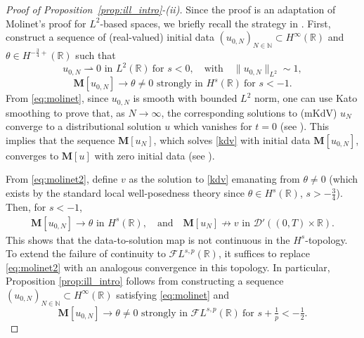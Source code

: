 \documentclass[a4paper,
11pt,  reqno]{amsart}
\newcommand{\5}{\textup{V}}
\newcommand{\FL}{\mathcal{F} L}
\theoremstyle{remark}
\newcommand{\R}{\mathbb{R}}
\newcommand{\MMb}{\mathbf{M}}
\newcommand{\N}{\mathbb{N}}
\numberwithin{equation}{section}
\numberwithin{theorem}{section}
\begin{document}
\begin{proof}[Proof of Proposition~\ref{prop:ill_intro}-(ii)]


Since the proof is an adaptation of Molinet's proof for $L^2$-based spaces, we briefly recall the strategy in \cite{Molinet_ill_line}.
 First, construct a sequence of (real-valued) initial data $(u_{0,N})_{N\in\N}\subset H^\infty(\R)$ and $\theta\in H^{-\frac34+}(\R)$ such that
\begin{equation}\label{eq:molinet}
	u_{0,N}\rightharpoonup 0 \mbox{ in }L^2(\R)\ \text{for } s<0,\quad \text{with}
    \quad \|u_{0,N}\|_{L^2}\sim 1,
\end{equation}
\begin{equation}\label{eq:molinet2}
 \MMb[u_{0,N}] \to \theta\neq 0  \mbox{ strongly in }H^{s}(\R)
 \ \text{for }
 s<-1.
\end{equation}
From \eqref{eq:molinet}, since $u_{0,N}$ is smooth with bounded $L^2$ norm, one can use Kato smoothing to prove that, as $N\to \infty$, the corresponding solutions to (mKdV) $u_N$ converge to a distributional solution $u$ which vanishes for $t=0$ (see \cite[Proposition 2.1]{Molinet_ill_line}). This implies that the sequence $\MMb[u_N]$, which solves \eqref{kdv} with initial data $\MMb[u_{0,N}]$, converges to $\MMb[u]$ with zero initial data (see \cite[Proposition 2.2]{Molinet_ill_line}).

From \eqref{eq:molinet2}, define $v$ as the solution to \eqref{kdv} emanating from $\theta\neq 0$ (which exists by the standard local well-posedness theory since $\theta\in H^s(\R)$, $s>-\frac34$).
Then, for $s<-1$,
\begin{align}
\MMb[u_{0, N}] \to \theta \mbox{ in }H^s(\R),
\quad
\text{and}
\quad
\MMb[u_N] \not\to v \mbox{ in  }\mathcal{D}'((0,T)\times \R).
\end{align}
This shows that the data-to-solution map is not continuous in the $H^s$-topology.
To extend the failure of continuity to $\FL^{s,p}(\R)$, it suffices to replace \eqref{eq:molinet2} with an analogous convergence in this topology.
In particular, Proposition \ref{prop:ill_intro} follows from constructing a sequence $(u_{0,N})_{N\in \N} \subset H^\infty(\R)$ satisfying \eqref{eq:molinet} and
\begin{equation}\label{eq:molinet2_v2}
 \MMb[u_{0,N}] \to \theta\neq 0 \mbox{ strongly in }\mathcal{F}L^{s,p}(\R) \ \text{for } s+\tfrac1p<-\tfrac12.
\end{equation}





\end{proof}
\end{document}
